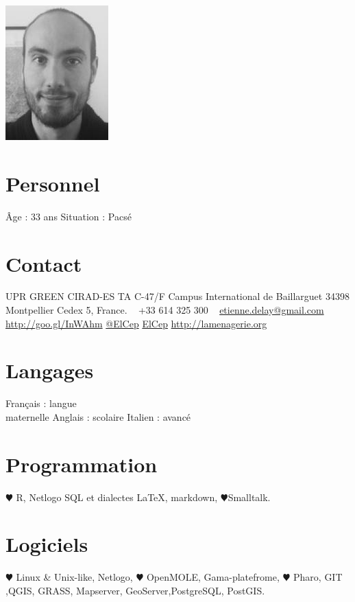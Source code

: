 \documentclass[]{cv-etienne}
\begin{document}

\begin{aside} %
\includegraphics{img/delay_s}
\section{Personnel}
Âge : 33 ans
Situation : Pacsé
\section{Contact}
UPR GREEN
CIRAD-ES
TA C-47/F
Campus International de Baillarguet
34398 Montpellier Cedex 5, France.
~
+33 614 325 300
~
{\color{lightgray}{\FA \faEnvelope}} \href{mailto:etienne.delay@gmail.com}{\footnotesize etienne.delay@gmail.com}
{\color{linkedin}{\FA \faLinkedin}} \href{https://fr.linkedin.com/in/etienne-delay-8871a45b}{\footnotesize http://goo.gl/InWAhm}
{\color{twitter}{\FA \faTwitter}} {\footnotesize \href{https://twitter.com/ElCep}{@ElCep}}
{\color{github}{\FA \faGithub}} {\footnotesize \href{https://github.com/ElCep}{ElCep}}
{\color{lightgray}{\FA \faHome}} {\footnotesize \href{http://elcep.legtux.org}{http://lamenagerie.org}}
\section{Langages}
Français : langue\\ maternelle
Anglais : scolaire
Italien : avancé
\section{Programmation}
{\color{red} $\varheartsuit$} R, Netlogo
SQL et dialectes
\LaTeX, markdown,
{\color{red} $\varheartsuit$}Smalltalk.
\section{Logiciels}
{\color{red} $\varheartsuit$} Linux \& Unix-like,
Netlogo, {\color{red} $\varheartsuit$} OpenMOLE,
Gama-platefrome,
{\color{red} $\varheartsuit$} Pharo, GIT ,QGIS,
GRASS, Mapserver, GeoServer,PostgreSQL, PostGIS.
\end{aside}
\end{document}
